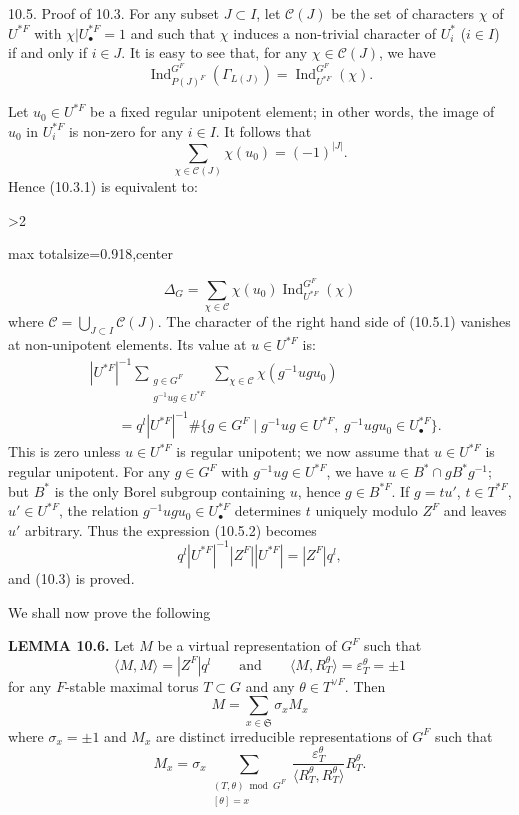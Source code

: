 \documentclass[9pt,twoside]{extarticle}
\newcommand{\EditionPage}[3]{%
  \ifnum#1>2\clearpage\fi
  \pdfbookmark[1]{Printed page #2}{en-folio-#2}%
  \hypertarget{en-physical-#1}{}%
  \noindent\begin{adjustbox}{max totalsize={\textwidth}{0.918\textheight},center}
  \begin{minipage}[t]{\textwidth}
  \fontsize{9.4}{11.1}\selectfont\justifying
  #3
  \end{minipage}
  \end{adjustbox}%
}
\begin{document}
{10.5. Proof of 10.3. For any subset \(J\subset I\), let \(\mathcal C(J)\) be the set of characters \(\chi\) of \(U^{*F}\) with \(\chi|U_\bullet^{*F}=1\) and such that \(\chi\) induces a non-trivial character of \(U_i^*\) (\(i\in I\)) if and only if \(i\in J\). It is easy to see that, for any \(\chi\in\mathcal C(J)\), we have \[
\operatorname{Ind}_{P(J)^F}^{G^F}(\Gamma_{L(J)})
=
\operatorname{Ind}_{U^{*F}}^{G^F}(\chi).
\]\par

Let \(u_0\in U^{*F}\) be a fixed regular unipotent element; in other words, the image of \(u_0\) in \(U_i^{*F}\) is non-zero for any \(i\in I\). It follows that \[
\sum_{\chi\in\mathcal C(J)}\chi(u_0)=(-1)^{|J|}.
\] Hence (10.3.1) is equivalent to:\par
}

\EditionPage{55}{156}{%
\[
\tag{10.5.1}
\Delta_G
=
\sum_{\chi\in\mathcal C}\chi(u_0)\operatorname{Ind}_{U^{*F}}^{G^F}(\chi)
\] where \(\mathcal C=\bigcup_{J\subset I}\mathcal C(J)\). The character of the right hand side of (10.5.1) vanishes at non-unipotent elements. Its value at \(u\in U^{*F}\) is: \[
\tag{10.5.2}
\begin{aligned}
&|U^{*F}|^{-1}
\sum_{\substack{g\in G^F\\g^{-1}ug\in U^{*F}}}
\sum_{\chi\in\mathcal C}\chi(g^{-1}ugu_0)\\
&\qquad=q^l|U^{*F}|^{-1}
\#\{g\in G^F\mid g^{-1}ug\in U^{*F},\ g^{-1}ugu_0\in U_\bullet^{*F}\}.
\end{aligned}
\] This is zero unless \(u\in U^{*F}\) is regular unipotent; we now assume that \(u\in U^{*F}\) is regular unipotent. For any \(g\in G^F\) with \(g^{-1}ug\in U^{*F}\), we have \(u\in B^*\cap gB^*g^{-1}\); but \(B^*\) is the only Borel subgroup containing \(u\), hence \(g\in B^{*F}\). If \(g=tu'\), \(t\in T^{*F}\), \(u'\in U^{*F}\), the relation \(g^{-1}ugu_0\in U_\bullet^{*F}\) determines \(t\) uniquely modulo \(Z^F\) and leaves \(u'\) arbitrary. Thus the expression (10.5.2) becomes \[
q^l|U^{*F}|^{-1}|Z^F||U^{*F}|=|Z^F|q^l,
\] and (10.3) is proved.\par

We shall now prove the following\par

\noindent\textbf{LEMMA 10.6.} Let \(M\) be a virtual representation of \(G^F\) such that \[
\langle M,M\rangle=|Z^F|q^l
\qquad\text{and}\qquad
\langle M,R_T^\theta\rangle=\varepsilon_T^\theta=\pm1
\] for any \(F\)-stable maximal torus \(T\subset G\) and any \(\theta\in T^{\vee F}\). Then \[
M=\sum_{x\in\mathfrak S}\sigma_xM_x
\] where \(\sigma_x=\pm1\) and \(M_x\) are distinct irreducible representations of \(G^F\) such that \[
M_x
=
\sigma_x
\sum_{\substack{(T,\theta)\bmod G^F\\{}[\theta]=x}}
\frac{\varepsilon_T^\theta}{\langle R_T^\theta,R_T^\theta\rangle}R_T^\theta.
\]\par

}
\end{document}
